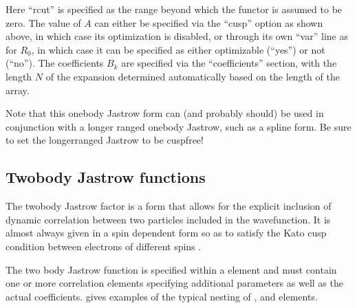 \documentclass[letterpaper,10pt,english]{sphinxmanual}
\begin{document}
\begin{sphinxVerbatim}[commandchars=\\\{\}]
       
               
\end{sphinxVerbatim}

Here “rcut” is specified as the range beyond which the functor is
assumed to be zero. The value of \(A\) can either be specified via
the “cusp” option as shown above, in which case its optimization is
disabled, or through its own “var” line as for \(R_0\), in which
case it can be specified as either optimizable (“yes”) or not (“no”).
The coefficients \(B_k\) are specified via the “coefficients”
section, with the length \(N\) of the expansion determined
automatically based on the length of the array.

Note that this one\sphinxhyphen{}body Jastrow form can (and probably should) be used in conjunction
with a longer ranged one\sphinxhyphen{}body Jastrow, such as a spline form.
Be sure to set the longer\sphinxhyphen{}ranged Jastrow to be cusp\sphinxhyphen{}free!


\subsection{Two\sphinxhyphen{}body Jastrow functions}
\label{\detokenize{intro_wavefunction:two-body-jastrow-functions}}
The two\sphinxhyphen{}body Jastrow factor is a form that allows for the explicit inclusion
of dynamic correlation between two particles included in the wavefunction.  It
is almost always given in a spin dependent form so as to satisfy the Kato cusp
condition between electrons of different spins .

The two body Jastrow function is specified within a  element
and must contain one or more correlation elements specifying additional parameters
as well as the actual coefficients.  {\hyperref[\detokenize{intro_wavefunction:id11}]{}} gives
examples of the typical nesting of ,  and
 elements.
\end{document}
